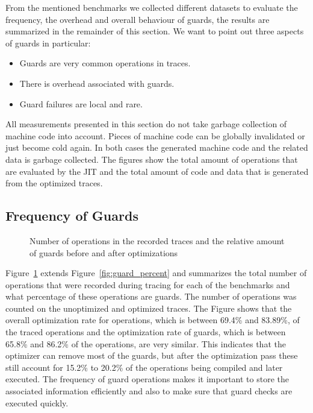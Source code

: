 \documentclass[10pt,preprint]{sigplanconf}
\begin{document}
From the mentioned benchmarks we collected different datasets to evaluate the
frequency, the overhead and overall behaviour of guards, the results are
summarized in the remainder of this section. We want to point out three
aspects of guards in particular:
\begin{itemize}
  \item Guards are very common operations in traces.
  \item There is overhead associated with guards.
  \item Guard failures are local and rare.
\end{itemize}

All measurements presented in this section do not take garbage collection of machine code into account. Pieces
of machine code can be globally invalidated or just become cold again. In both
cases the generated machine code and the related data is garbage collected. The
figures show the total amount of operations that are evaluated by the JIT and
the total amount of code and data that is generated from the optimized traces.


\subsection{Frequency of Guards}
\label{sub:guard_frequency}
\begin{figure}
    
    \caption{Number of operations in the recorded traces and the relative amount of guards before and after optimizations}
    \label{fig:benchmarks}
\end{figure}

Figure~\ref{fig:benchmarks} extends Figure~\ref{fig:guard_percent} and summarizes the total number of operations that were
recorded during tracing for each of the benchmarks and what percentage of these
operations are guards. The number of operations was counted on the unoptimized
and optimized traces. The Figure shows that the overall optimization rate for
operations, which is between 69.4\% and 83.89\%, of the traced operations and the
optimization rate of guards, which is between 65.8\% and 86.2\% of the
operations, are very similar. This indicates that the optimizer can remove
most of the guards, but after the optimization pass these still account for
15.2\% to 20.2\% of the operations being compiled and later executed.
The frequency of guard operations makes it important to store the associated
information efficiently and also to make sure that guard checks are executed
quickly.
\end{document}

